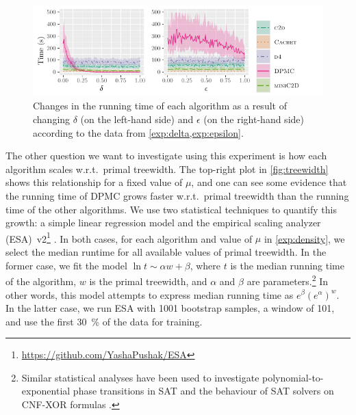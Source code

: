 \begin{figure}[t]
  \centering
  \includegraphics{chapters/comparison/delta_epsilon}
  \caption{Changes in the running time of each algorithm as a result of changing
    $\delta$ (on the left-hand side) and $\epsilon$ (on the right-hand side)
    according to the data from
    \cref{exp:delta,exp:epsilon}.}\label{fig:delta_epsilon}
\end{figure}

The other question we want to investigate using this experiment is how each
algorithm scales w.r.t.\ primal treewidth. The top-right plot in
\cref{fig:treewidth} shows this relationship for a fixed value of $\mu$, and one
can see some evidence that the running time of \textsc{DPMC} grows faster
w.r.t.\ primal treewidth than the running time of the other algorithms. We use
two statistical techniques to quantify this growth: a simple linear regression
model and the empirical scaling analyzer
(ESA)~v2\footnote{\url{https://github.com/YashaPushak/ESA}}
\citep{DBLP:conf/gecco/PushakH20}. In both cases, for each algorithm and value
of $\mu$ in \cref{exp:density}, we select the median runtime for all available
values of primal treewidth. In the former case, we fit the model
$\ln t \sim \alpha w + \beta$, where $t$ is the median running time of the
algorithm, $w$ is the primal treewidth, and $\alpha$ and $\beta$ are
parameters.\footnote{Similar statistical analyses have been used to investigate
  polynomial-to-exponential phase transitions in SAT
  \citep{DBLP:journals/constraints/CoarfaDASV03} and the behaviour of SAT
  solvers on CNF-XOR formulas \citep{DBLP:conf/ijcai/DudekMV17}.} In other
words, this model attempts to express median running time as
$e^\beta{(e^\alpha)}^w$. In the latter case, we run ESA with 1001 bootstrap
samples, a window of 101, and use the first \SI{30}{\percent} of the data for
training.

